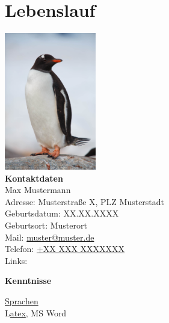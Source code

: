 \chapter{Lebenslauf}\vspace{1cm}
\begin{vwcol}[widths={0.4,0.6}, rule=0.4pt, sep=.5em, indent=.5em]
  \begin{centering}
  \includegraphics[width=4cm]{./Profile_Pic.jpg}\\

  \Large\textbf{Kontaktdaten}\\
  \normalsize
  Max Mustermann\\
  Adresse: Musterstraße X, PLZ Musterstadt\\
  Geburtsdatum: XX.XX.XXXX\\
  Geburtsort: Musterort\\
  Mail: \href{mailto:muster@muster.de}{muster@muster.de}\\
  Telefon: \href{tel:+XXXXXXXXXX}{+XX XXX XXXXXXX}\\
  Links: \LARGE \hspace{0.2 cm} \href{https://www.linkedin.com/muster}{\faLinkedin} \hspace{0.5 cm}\href{https://github.com/muster}{\faGithub} \hspace{0.5 cm}\href{https://www.instagram.com/muster/}{\faInstagram}\\\vspace{0.8cm}

  \Large\textbf{Kenntnisse}\\
  \end{centering}  \normalsize
  \hyperref[<reference>]{Sprachen}\\
  L\href{<reference_url>}{atex}, MS Word\\

  \vspace{0.8cm}


\end{vwcol}
